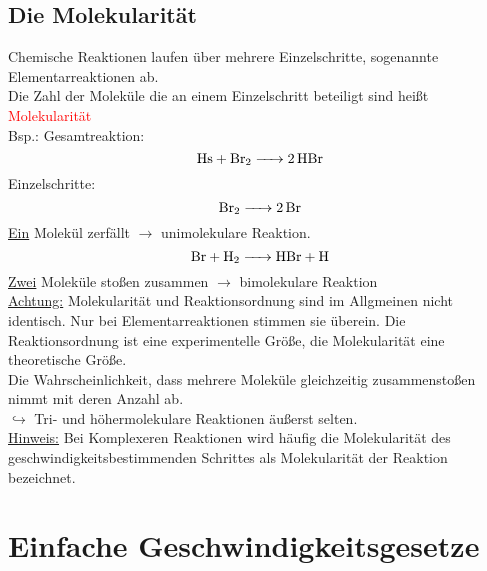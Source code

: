 \documentclass[a4paper, fleqn]{article}
\begin{document}
\subsection{Die Molekularität}
Chemische Reaktionen laufen über mehrere Einzelschritte, sogenannte Elementarreaktionen ab.\\
Die Zahl der Moleküle die an einem Einzelschritt beteiligt sind heißt \textcolor{red}{Molekularität}\\
Bsp.: Gesamtreaktion:\\
\begin{equation*}
    \ce{Hs + Br2 -> 2HBr}
\end{equation*}
Einzelschritte:\\
\begin{equation*}
    \ce{Br2 -> 2 Br}
\end{equation*}
\underline{Ein} Molekül zerfällt $\rightarrow$ unimolekulare Reaktion.\\
\begin{equation*}
    \ce{Br + H2 -> HBr + H}
\end{equation*}
\underline{Zwei} Moleküle stoßen zusammen $\rightarrow$ bimolekulare Reaktion\\
\underline{Achtung:} Molekularität und Reaktionsordnung sind im Allgmeinen nicht identisch. Nur bei Elementarreaktionen stimmen sie überein. Die Reaktionsordnung ist eine experimentelle Größe, die Molekularität eine theoretische Größe.\\
Die Wahrscheinlichkeit, dass mehrere Moleküle gleichzeitig zusammenstoßen nimmt mit deren Anzahl ab.\\
$\hookrightarrow$ Tri- und höhermolekulare Reaktionen äußerst selten.\\
\underline{Hinweis:} Bei Komplexeren Reaktionen wird häufig die Molekularität des geschwindigkeitsbestimmenden Schrittes als Molekularität der Reaktion bezeichnet.\\

\section{Einfache Geschwindigkeitsgesetze}
\end{document}
